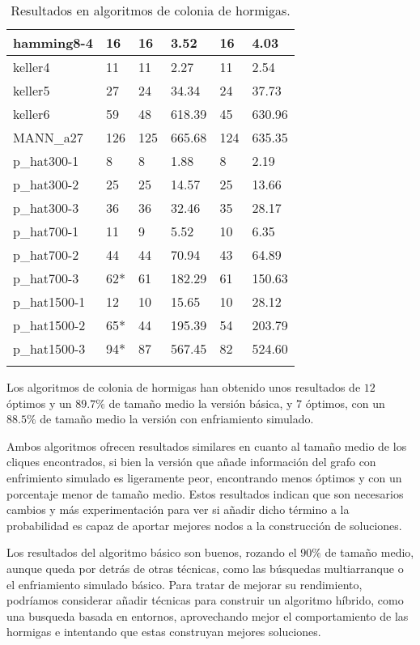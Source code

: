 \begin{small}
\begin{longtable}{l l l l l l}
    hamming8-4         & 16 & 16 & 3.52 & 16 & 4.03\\ \hline
    keller4            & 11 & 11 & 2.27 & 11 & 2.54\\ \hline
    keller5            & 27 & 24 & 34.34 & 24 & 37.73\\ \hline
    keller6            & 59 & 48 & 618.39 & 45 & 630.96\\ \hline
    MANN\_a27          & 126 & 125 & 665.68 & 124 & 635.35\\ \hline
    p\_hat300-1        & 8 & 8 & 1.88 & 8 & 2.19\\ \hline
    p\_hat300-2        & 25 & 25 & 14.57 & 25 & 13.66\\ \hline
    p\_hat300-3        & 36 & 36 & 32.46 & 35 & 28.17\\ \hline
    p\_hat700-1        & 11 & 9 & 5.52 & 10 & 6.35\\ \hline
    p\_hat700-2        & 44 & 44 & 70.94 & 43 & 64.89\\ \hline
    p\_hat700-3        & 62* & 61 & 182.29 & 61 & 150.63\\ \hline
    p\_hat1500-1       & 12 & 10 & 15.65 & 10 & 28.12 \\ \hline
    p\_hat1500-2       & 65* & 44 & 195.39 & 54 & 203.79\\ \hline
    p\_hat1500-3       & 94* & 87 & 567.45 & 82 & 524.60 \\ \hline
  \caption{Resultados en algoritmos de colonia de hormigas.}
\end{longtable}
\end{small}

Los algoritmos de colonia de hormigas han obtenido unos resultados de $12$ óptimos
y un $89.7\%$ de tamaño medio la versión básica, y $7$ óptimos, con un $88.5\%$
de tamaño medio la versión con enfriamiento simulado.

Ambos algoritmos ofrecen resultados similares en cuanto al tamaño medio de los cliques
encontrados, si bien la versión que añade información del grafo con enfrimiento simulado
es ligeramente peor, encontrando menos óptimos y con un porcentaje menor de tamaño medio.
Estos resultados indican que son necesarios cambios y más experimentación para ver si
añadir dicho  término a la probabilidad es capaz de aportar mejores nodos a la
construcción de soluciones.

Los resultados del algoritmo básico son buenos, rozando el $90\%$ de tamaño medio,
aunque queda por detrás de otras técnicas, como las búsquedas multiarranque o el
enfriamiento simulado básico. Para tratar de mejorar su rendimiento, podríamos
considerar añadir técnicas para construir un algoritmo híbrido, como una busqueda
basada en entornos, aprovechando mejor el comportamiento de las hormigas e intentando
que estas construyan mejores soluciones.

